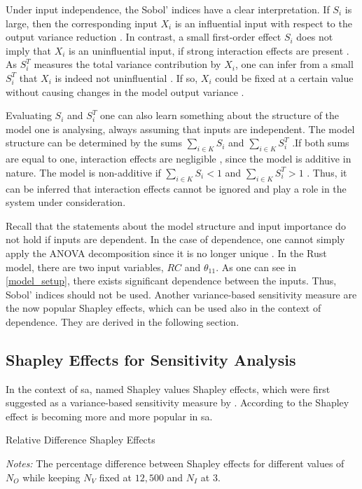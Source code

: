Under input independence, the Sobol' indices have a clear interpretation. If $S_i$ is large, then the corresponding input $X_i$ is an influential input with respect to the output variance reduction \citep{GM17}. In contrast, a small first-order effect $S_i$ does not imply that $X_i$ is an uninfluential input, if strong interaction effects are present \citep{GM17}. As $S_i^T$ measures the total variance contribution by $X_i$, one can infer from a small $S_i^T$ that $X_i$ is indeed not uninfluential \citep{GM17}. If so, $X_i$ could be fixed at a certain value without causing changes in the model output variance \citep{GM17}.

Evaluating $S_i$ and $S_i^T$ one can also learn something about the structure of the model one is analysing, always assuming that inputs are independent. The model structure can be determined by the sums $\sum_{i \in K} S_i$ and $\sum_{i \in K} S_i^T$ \citep{GM17}.If both sums are equal to one, interaction effects are negligible , since the model is additive in nature. The model is non-additive if $\sum_{i \in K} S_i < 1$ and $\sum_{i \in K} S_i^T > 1$ \citep{GM17}. Thus, it can be inferred that interaction effects cannot be ignored and play a role in the system under consideration.

Recall that the statements about the model structure and input importance do not hold if inputs are dependent. In the case of dependence, one cannot simply apply the ANOVA decomposition since it is no longer unique \citep{O14}. In the Rust model, there are two input variables, $RC$ and $\theta_{11}$. As one can see in \cref{model_setup}, there exists significant dependence between the inputs. Thus, Sobol' indices should not be used. Another variance-based sensitivity measure are the now popular Shapley effects, which can be used also in the context of dependence. They are derived in the following section.

\subsection{Shapley Effects for Sensitivity Analysis}

In the context of sa, \citet{SNS16} named Shapley values Shapley effects, which were first suggested as a variance-based sensitivity measure by \citet{O14}. According to \citet{PRB20} the Shapley effect is becoming more and more popular in sa.

\begin{table}[t]
	\centering
	\caption{Relative Difference Shapley Effects}
	\label{rel_diff_shapley}
	\begin{threeparttable}
	\centering
	
	\begin{tablenotes}
	\small
	\item \textit{Notes:} The percentage difference between Shapley effects for different values of $N_O$ while keeping $N_V$ fixed at $12,500$ and $N_I$ at $3$.
	\end{tablenotes}
	\end{threeparttable}
\end{table}

